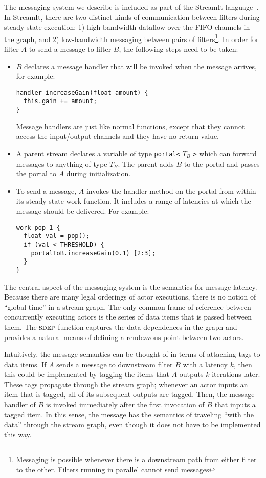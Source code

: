 The messaging system we describe is included as part of the StreamIt
language~\cite{streamitcc}.  In StreamIt, there are two distinct kinds
of communication between filters during steady state execution: 1)
high-bandwidth dataflow over the FIFO channels in the graph, and 2)
low-bandwidth messaging between pairs of filters\footnote{Messaging
is possible whenever there is a downstream path from either filter to
the other.  Filters running in parallel cannot send messages}.  In
order for filter $A$ to send a message to filter $B$, the following
steps need to be taken:
\begin{itemize}

\item $B$ declares a message handler that will be invoked when the
message arrives, for example:
{\small
\begin{verbatim}
handler increaseGain(float amount) {
  this.gain += amount;
}
\end{verbatim}
}
Message handlers are just like normal functions, except that they
cannot access the input/output channels and they have no return value.

\item A parent stream declares a variable of type {\tt portal<} $T_B$
{\tt >} which can forward messages to anything of type $T_B$.  The
parent adds $B$ to the portal and passes the portal to $A$ during
initialization.

\item To send a message, $A$ invokes the handler method on the portal
from within its steady state work function.  It includes a range of
latencies at which the message should be delivered.  For example:
{\small
\begin{verbatim}
work pop 1 {
  float val = pop();
  if (val < THRESHOLD) {
    portalToB.increaseGain(0.1) [2:3];
  }
}
\end{verbatim}}

\end{itemize}
The central aspect of the messaging system is the semantics for
message latency.  Because there are many legal orderings of actor
executions, there is no notion of ``global time'' in a stream graph.
The only common frame of reference between concurrently executing
actors is the series of data items that is passed between them.  The
$\textsc{sdep}$ function captures the data dependences in the graph and
provides a natural means of defining a rendezvous point between two
actors.

Intuitively, the message semantics can be thought of in terms of
attaching tags to data items.  If $A$ sends a message to downstream
filter $B$ with a latency $k$, then this could be implemented by
tagging the items that $A$ outputs $k$ iterations later.  These tags
propagate through the stream graph; whenever an actor inputs an item
that is tagged, all of its subsequent outputs are tagged.  Then, the
message handler of $B$ is invoked immediately after the first
invocation of $B$ that inputs a tagged item.  In this sense, the
message has the semantics of traveling ``with the data'' through the
stream graph, even though it does not have to be implemented this way.

